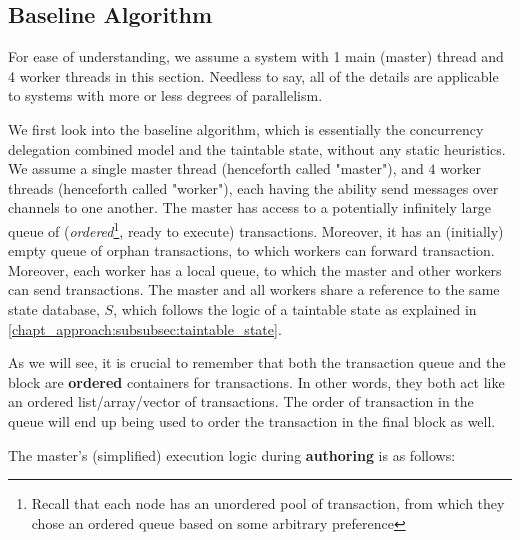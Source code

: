 \subsection{Baseline Algorithm} \label{subsec:baseline_alg}

\begin{remark}
	For ease of understanding, we assume a system with 1 main (master) thread and 4 worker threads
	in this section. Needless to say, all of the details are applicable to systems with more or less
	degrees of parallelism.
\end{remark}

We first look into the baseline algorithm, which is essentially the concurrency delegation
combined model and the taintable state, without any static heuristics. We assume a single master
thread (henceforth called "master"), and $4$ worker threads (henceforth called "worker"), each
having the ability send messages over channels to one another. The master has access to a
potentially infinitely large queue of (\textit{ordered}\footnote{Recall that each node has an
unordered pool of transaction, from which they chose an ordered queue based on some arbitrary
preference}, ready to execute) transactions. Moreover, it has an (initially) empty queue of orphan
transactions, to which workers can forward transaction. Moreover, each worker has a local queue, to
which the master and other workers can send transactions. The master and all workers share a
reference to the same state database, $S$, which follows the logic of a taintable state as explained
in \ref{chapt_approach:subsubsec:taintable_state}.

\begin{remark}
	As we will see, it is crucial to remember that both the transaction queue and the block are
	\textbf{ordered} containers for transactions. In other words, they both act like an ordered
	list/array/vector of transactions. The order of transaction in the queue will end up being used
	to order the transaction in the final block as well.
\end{remark}

The master's (simplified) execution logic during \textbf{authoring} is as follows:


